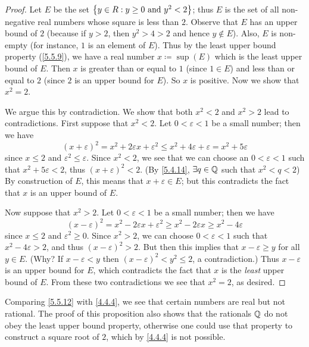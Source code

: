 \begin{proof}
  Let \(E\) be the set \(\left\lbrace y \in R : y \geq 0 \text{ and } y^2 < 2\right\rbrace\);
  thus \(E\) is the set of all non-negative real numbers whose square is less than \(2\).
  Observe that \(E\) has an upper bound of \(2\) (because if \(y > 2\), then \(y^2 > 4 > 2\) and hence \(y \notin E\)).
  Also, \(E\) is non-empty (for instance, \(1\) is an element of \(E\)).
  Thus by the least upper bound property (\cref{5.5.9}), we have a real number \(x \coloneqq \sup(E)\) which is the least upper bound of \(E\).
  Then \(x\) is greater than or equal to \(1\) (since \(1 \in E\)) and less than or equal to \(2\)
  (since \(2\) is an upper bound for \(E\)).
  So \(x\) is positive.
  Now we show that \(x^2 = 2\).

  We argue this by contradiction.
  We show that both \(x^2 < 2\) and \(x^2 > 2\) lead to contradictions.
  First suppose that \(x^2 < 2\).
  Let \(0 < \varepsilon < 1\) be a small number;
  then we have
  \[
    (x + \varepsilon)^2 = x^2 + 2\varepsilon x + \varepsilon^2 \leq x^2 + 4\varepsilon + \varepsilon = x^2 + 5\varepsilon
  \]
  since \(x \leq 2\) and \(\varepsilon^2 \leq \varepsilon\).
  Since \(x^2 < 2\), we see that we can choose an \(0 < \varepsilon < 1\) such that \(x^2 + 5\varepsilon < 2\), thus \((x + \varepsilon)^2 < 2\).
  (By \cref{5.4.14}, \(\exists q \in \mathbb{Q}\) such that \(x^2 < q < 2\))
  By construction of \(E\), this means that \(x + \varepsilon \in E\);
  but this contradicts the fact that \(x\) is an upper bound of \(E\).

  Now suppose that \(x^2 > 2\).
  Let \(0 < \varepsilon < 1\) be a small number;
  then we have
  \[
    (x - \varepsilon)^2 = x^2 - 2\varepsilon x + \varepsilon^2 \geq x^2 - 2\varepsilon x \geq x^2 - 4\varepsilon
  \]
  since \(x \leq 2\) and \(\varepsilon^2 \geq 0\).
  Since \(x^2 > 2\), we can choose \(0 < \varepsilon < 1\) such that \(x^2 - 4\varepsilon > 2\), and thus \((x - \varepsilon)^2 > 2\).
  But then this implies that \(x - \varepsilon \geq y\) for all \(y \in E\).
  (Why? If \(x - \varepsilon < y\) then \((x - \varepsilon)^2 < y^2 \leq 2\), a contradiction.)
  Thus \(x - \varepsilon\) is an upper bound for \(E\), which contradicts the fact that \(x\) is the \emph{least} upper bound of \(E\).
  From these two contradictions we see that \(x^2 = 2\), as desired.
\end{proof}

\begin{rmk}\label{5.5.13}
  Comparing \cref{5.5.12} with \cref{4.4.4}, we see that certain numbers are real but not rational.
  The proof of this proposition also shows that the rationals \(\mathbb{Q}\) do not obey the least upper bound property, otherwise one could use that property to construct a square root of \(2\), which by \cref{4.4.4} is not possible.
\end{rmk}

